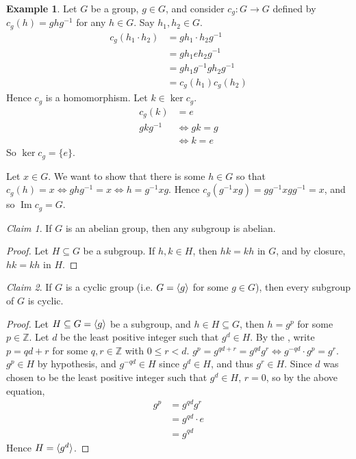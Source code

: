 \documentclass[12pt,letterpaper,DIV=11,final]{scrartcl}
\theoremstyle{plain}
\theoremstyle{definition}
\newtheorem{example}{Example}[section]
\theoremstyle{remark}
\newtheorem{claim}{Claim}
\DeclareMathOperator{\ima}{Im}
\begin{document}
\begin{example}\label{ex:c_g}
  Let $G$ be a group, $g \in G$, and consider $c_g : G \to G$ defined by $c_g(h) = g h g^{-1}$ for any $h \in G$.
  Say $h_1, h_2 \in G$.
  \begin{align*}
    c_g(h_1 \cdot h_2) &= g h_1 \cdot h_2 g^{-1} \\
                       &= g h_1 e h_2 g^{-1} \\
                       &= g h_1 g^{-1} g h_2 g^{-1} \\
                       &= c_g(h_1) c_g(h_2)
  \end{align*}
  Hence $c_g$ is a homomorphism.
  Let $k \in \ker c_g$.
  \begin{align*}
    c_g(k) &= e \\
    g k g^{-1} &\iff gk = g \\
               &\iff k = e
  \end{align*}
  So $\ker c_g = \{ e \}$.

  Let $x \in G$.
  We want to show that there is some $h \in G$ so that $c_g(h) = x \iff g h g^{-1} = x \iff h = g^{-1} x g$.
  Hence $c_g(g^{-1} x g) = g g^{-1} x g g^{-1} = x$, and so $\ima c_g = G$.
\end{example}

\begin{claim}
  If $G$ is an abelian group, then any subgroup is abelian.

  \begin{proof}
    Let $H \subseteq G$ be a subgroup.
    If $h, k \in H$, then $hk = kh$ in $G$, and by closure, $hk = kh$ in $H$.
  \end{proof}
\end{claim}

\begin{claim}
  If $G$ is a cyclic group (i.e. $G = \braket{g}$ for some $g \in G$), then every subgroup of $G$ is cyclic.

  \begin{proof}
    Let $H \subseteq G = \braket{g}$ be a subgroup, and $h \in H \subseteq G$, then $h = g^p$ for some $p \in \mathbb{Z}$.
    Let $d$ be the least positive integer such that $g^d \in H$.
    By the , write $p = qd + r$ for some $q, r \in \mathbb{Z}$ with $0 \leq r < d$.
    $g^p = g^{qd + r} = g^{qd} g^r \iff g^{-qd} \cdot g^p = g^r$.
    $g^p \in H$ by hypothesis, and $g^{-qd} \in H$ since $g^d \in H$, and thus $g^r \in H$.
    Since $d$ was chosen to be the least positive integer such that $g^d \in H$, $r = 0$, so by the above equation,
    \begin{align*}
      g^p &= g^{qd} g^r \\
          &= g^{qd} \cdot e \\
          &= g^{qd}
    \end{align*}
    Hence $H = \braket{g^d}$.
  \end{proof}
\end{claim}
\end{document}
